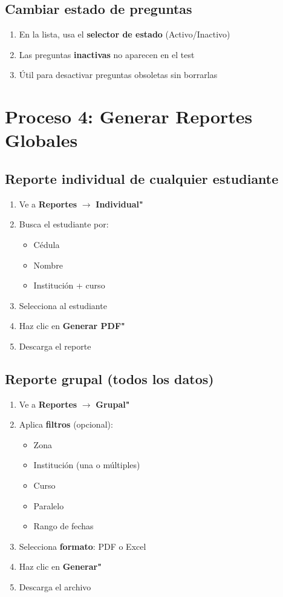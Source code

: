 \documentclass[12pt, a4paper]{report}
\begin{document}
\subsection{Cambiar estado de preguntas}
\begin{enumerate}
    \item En la lista, usa el \textbf{selector de estado} (Activo/Inactivo)
    \item Las preguntas \textbf{inactivas} no aparecen en el test
    \item Útil para desactivar preguntas obsoletas sin borrarlas
\end{enumerate}

\section{Proceso 4: Generar Reportes Globales}

\subsection{Reporte individual de cualquier estudiante}
\begin{enumerate}
    \item Ve a \textbf{Reportes} $\rightarrow$ \textbf{Individual"}
    \item Busca el estudiante por:
    \begin{itemize}
        \item Cédula
        \item Nombre
        \item Institución + curso
    \end{itemize}
    \item Selecciona al estudiante
    \item Haz clic en \textbf{Generar PDF"}
    \item Descarga el reporte
\end{enumerate}

\subsection{Reporte grupal (todos los datos)}
\begin{enumerate}
    \item Ve a \textbf{Reportes} $\rightarrow$ \textbf{Grupal"}
    \item Aplica \textbf{filtros} (opcional):
    \begin{itemize}
        \item Zona
        \item Institución (una o múltiples)
        \item Curso
        \item Paralelo
        \item Rango de fechas
    \end{itemize}
    \item Selecciona \textbf{formato}: PDF o Excel
    \item Haz clic en \textbf{Generar"}
    \item Descarga el archivo
\end{enumerate}
\end{document}
